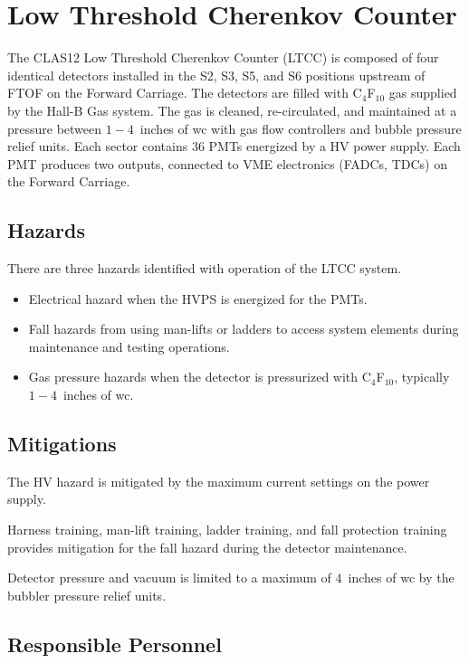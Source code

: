 \section{Low Threshold Cherenkov Counter}

The CLAS12 Low Threshold Cherenkov Counter (LTCC) is composed of four identical detectors
installed in the S2, S3, S5, and S6 positions upstream of FTOF on the Forward Carriage. 
The detectors are filled with C$_4$F$_{10}$ gas supplied by the Hall-B Gas system. The gas 
is cleaned, re-circulated, and maintained at a pressure between $1 - 4$~inches of wc with 
gas flow controllers and bubble pressure relief units. Each sector contains 36 PMTs energized 
by a HV power supply. Each PMT produces two outputs, connected to VME electronics (FADCs, 
TDCs) on the Forward Carriage.

\subsection{Hazards} 

There are three hazards identified with operation of the LTCC system. 
\begin{itemize}
\item Electrical hazard when the HVPS is energized for the PMTs.
\item Fall hazards from using man-lifts or ladders to access system elements during 
maintenance and testing operations. 
\item Gas pressure hazards when the detector is pressurized with C$_4$F$_{10}$, typically 
$1 -4$~inches of wc.
\end{itemize}

\subsection{Mitigations}

The HV hazard is mitigated by the maximum current settings on the power supply.

Harness training, man-lift training, ladder training, and fall protection training provides 
mitigation for the fall hazard during the detector maintenance.

Detector pressure and vacuum is limited to a maximum of $4$~inches of wc by the bubbler 
pressure relief units.

\subsection{Responsible Personnel}

